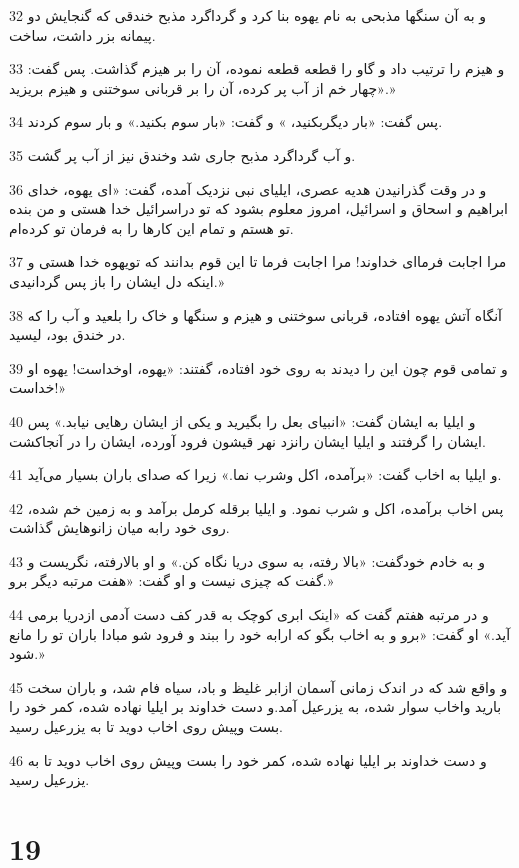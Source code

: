 \par 32 و به آن سنگها مذبحی به نام یهوه بنا کرد و گرداگرد مذبح خندقی که گنجایش دو پیمانه بزر داشت، ساخت.
\par 33 و هیزم را ترتیب داد و گاو را قطعه قطعه نموده، آن را بر هیزم گذاشت. پس گفت: «چهار خم از آب پر کرده، آن را بر قربانی سوختنی و هیزم بریزید.»
\par 34 پس گفت: «بار دیگربکنید، » و گفت: «بار سوم بکنید.» و بار سوم کردند.
\par 35 و آب گرداگرد مذبح جاری شد وخندق نیز از آب پر گشت.
\par 36 و در وقت گذرانیدن هدیه عصری، ایلیای نبی نزدیک آمده، گفت: «ای یهوه، خدای ابراهیم و اسحاق و اسرائیل، امروز معلوم بشود که تو دراسرائیل خدا هستی و من بنده تو هستم و تمام این کارها را به فرمان تو کرده‌ام.
\par 37 مرا اجابت فرما‌ای خداوند! مرا اجابت فرما تا این قوم بدانند که تویهوه خدا هستی و اینکه دل ایشان را باز پس گردانیدی.»
\par 38 آنگاه آتش یهوه افتاده، قربانی سوختنی و هیزم و سنگها و خاک را بلعید و آب را که در خندق بود، لیسید.
\par 39 و تمامی قوم چون این را دیدند به روی خود افتاده، گفتند: «یهوه، اوخداست! یهوه او خداست!»
\par 40 و ایلیا به ایشان گفت: «انبیای بعل را بگیرید و یکی از ایشان رهایی نیابد.» پس ایشان را گرفتند و ایلیا ایشان رانزد نهر قیشون فرود آورده، ایشان را در آنجاکشت.
\par 41 و ایلیا به اخاب گفت: «برآمده، اکل وشرب نما.» زیرا که صدای باران بسیار می‌آید.
\par 42 پس اخاب برآمده، اکل و شرب نمود. و ایلیا برقله کرمل برآمد و به زمین خم شده، روی خود رابه میان زانوهایش گذاشت.
\par 43 و به خادم خودگفت: «بالا رفته، به سوی دریا نگاه کن.» و او بالارفته، نگریست و گفت که چیزی نیست و او گفت: «هفت مرتبه دیگر برو.»
\par 44 و در مرتبه هفتم گفت که «اینک ابری کوچک به قدر کف دست آدمی ازدریا برمی آید.» او گفت: «برو و به اخاب بگو که ارابه خود را ببند و فرود شو مبادا باران تو را مانع شود.»
\par 45 و واقع شد که در اندک زمانی آسمان ازابر غلیظ و باد، سیاه فام شد، و باران سخت بارید واخاب سوار شده، به یزرعیل آمد.و دست خداوند بر ایلیا نهاده شده، کمر خود را بست وپیش روی اخاب دوید تا به یزرعیل رسید.
\par 46 و دست خداوند بر ایلیا نهاده شده، کمر خود را بست وپیش روی اخاب دوید تا به یزرعیل رسید.
 
\chapter{19}

